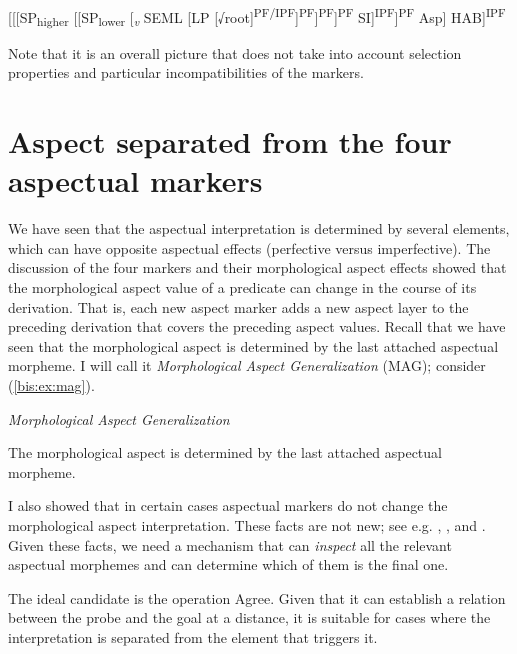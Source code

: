 \documentclass[output=paper]{langscibook}
\begin{document}

\ea\label{bis:ex:HABstr}	
[[[SP\textsubscript{higher} [[SP\textsubscript{lower} [\textsubscript{\textit{v}} SEML [LP [√root]\textsuperscript{PF/IPF}]\textsuperscript{PF}]\textsuperscript{PF}]\textsuperscript{PF} SI]\textsuperscript{IPF}]\textsuperscript{PF} Asp] HAB]\textsuperscript{IPF}\medskip\\
\z

\noindent Note that it is an overall picture that does not take into account selection properties and particular incompatibilities of the markers. 

\section{Aspect separated from the four aspectual markers}\label{bis:sec:asp} 
We have seen that the aspectual interpretation is determined by several elements, which can have opposite aspectual effects (perfective versus imperfective). The discussion of the four markers and their morphological aspect effects showed that the morphological aspect value of a predicate can change in the course of its derivation. That is, each new aspect marker adds a new aspect layer to the preceding derivation that covers the preceding aspect values. Recall that we have seen that the morphological aspect is determined by the last attached aspectual morpheme. I will call it \textit{Morphological Aspect Generalization} (MAG); consider (\ref{bis:ex:mag}).

\ea\label{bis:ex:mag}	
\textit{Morphological Aspect Generalization}

The morphological aspect is determined by the last attached aspectual morpheme.
\z

\noindent I also showed that in certain cases aspectual markers do not change the morphological aspect interpretation. These facts are not new; see e.g. \citet{Karcevski1927}, \citet{Isacenko1962}, \citet{Zinova.Filip2015} and \citet{Tatevosov2020}. Given these facts, we need a mechanism that can \textit{inspect} all the relevant aspectual morphemes and can determine which of them is the final one.

The ideal candidate is the operation Agree. Given that it can establish a relation between the probe and the goal at a distance, it is suitable for cases where the interpretation is separated from the element that triggers it.
\end{document}
